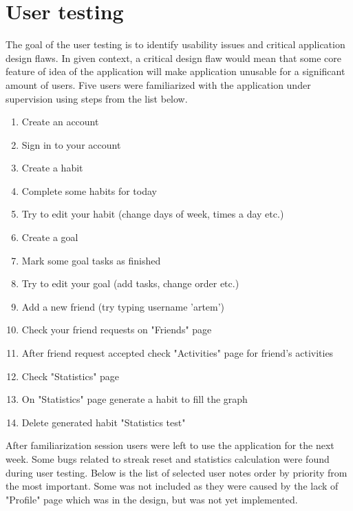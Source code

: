 
\section{User testing}\label{sec:user-testing}

The goal of the user testing is to identify usability issues and critical application design flaws.
In given context, a critical design flaw would mean that some core feature of idea of the application will make application unusable for a significant amount of users.
Five users were familiarized with the application under supervision using steps from the list below.

\begin{enumerate}
    \item Create an account
    \item Sign in to your account
    \item Create a habit
    \item Complete some habits for today
    \item Try to edit your habit (change days of week, times a day etc.)
    \item Create a goal
    \item Mark some goal tasks as finished
    \item Try to edit your goal (add tasks, change order etc.)
    \item Add a new friend (try typing username 'artem')
    \item Check your friend requests on "Friends" page
    \item After friend request accepted check "Activities" page for friend's activities
    \item Check "Statistics" page
    \item On "Statistics" page generate a habit to fill the graph
    \item Delete generated habit "Statistics test"
\end{enumerate}

After familiarization session users were left to use the application for the next week.
Some bugs related to streak reset and statistics calculation were found during user testing.
Below is the list of selected user notes order by priority from the most important.
Some was not included as they were caused by the lack of "Profile" page which was in the design, but was not yet implemented.

